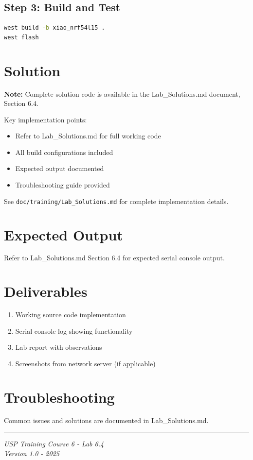\documentclass[11pt,a4paper]{article}
\begin{document}
\subsection{Step 3: Build and Test}
\begin{lstlisting}[language=bash]
west build -b xiao_nrf54l15 .
west flash
\end{lstlisting}

\section{Solution}

\begin{solutionbox}
\textbf{Note:} Complete solution code is available in the Lab\_Solutions.md document, Section 6.4.

Key implementation points:
\begin{itemize}
    \item Refer to Lab\_Solutions.md for full working code
    \item All build configurations included
    \item Expected output documented
    \item Troubleshooting guide provided
\end{itemize}

See \texttt{doc/training/Lab\_Solutions.md} for complete implementation details.
\end{solutionbox}

\section{Expected Output}

Refer to Lab\_Solutions.md Section 6.4 for expected serial console output.

\section{Deliverables}

\begin{enumerate}[itemsep=10pt]
    \item Working source code implementation
    \item Serial console log showing functionality
    \item Lab report with observations
    \item Screenshots from network server (if applicable)
\end{enumerate}

\section{Troubleshooting}

Common issues and solutions are documented in Lab\_Solutions.md.

\vfill
\noindent\rule{\textwidth}{0.4pt}
\begin{center}
\textit{USP Training Course 6 - Lab 6.4}\\
\textit{Version 1.0 - 2025}
\end{center}
\end{document}
